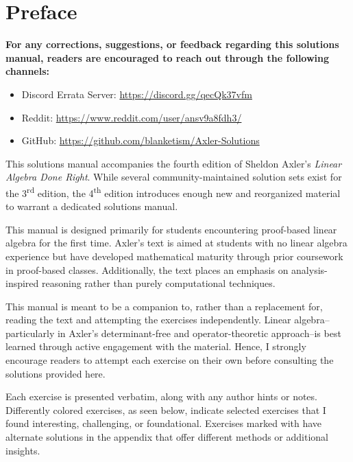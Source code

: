 \section*{Preface}

\textbf{For any corrections, suggestions, or feedback regarding this solutions manual, readers are encouraged to reach out through the following channels:}
\begin{itemize}
    \item Discord Errata Server: \href{https://discord.gg/qecQk37vfm}{https://discord.gg/qecQk37vfm}
    \item Reddit: \href{https://www.reddit.com/user/ansv9a8fdh3/}{https://www.reddit.com/user/ansv9a8fdh3/}
    \item GitHub: \href{https://github.com/blanketism/Axler-Solutions}{https://github.com/blanketism/Axler-Solutions}
\end{itemize}

This solutions manual accompanies the fourth edition of Sheldon Axler's \emph{Linear Algebra Done Right}.
While several community-maintained solution sets exist for the 3\textsuperscript{rd} edition, the 4\textsuperscript{th} edition introduces enough new and reorganized material to warrant a dedicated solutions manual.

This manual is designed primarily for students encountering proof-based linear algebra for the first time.
Axler's text is aimed at students with no linear algebra experience but have developed mathematical maturity through prior coursework in proof-based classes.
Additionally, the text places an emphasis on analysis-inspired reasoning rather than purely computational techniques.

This manual is meant to be a companion to, rather than a replacement for, reading the text and attempting the exercises independently.
Linear algebra--particularly in Axler's determinant-free and operator-theoretic approach--is best learned through active engagement with the material.
Hence, I strongly encourage readers to attempt each exercise on their own before consulting the solutions provided here.

Each exercise is presented verbatim, along with any author hints or notes.
Differently colored exercises, as seen below, indicate selected exercises that I found interesting, challenging, or foundational.
Exercises marked with \textcolor{basecolor}{} have alternate solutions in the appendix that offer different methods or additional insights.

